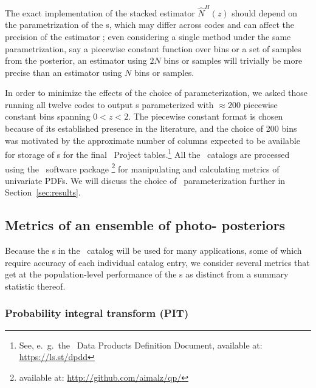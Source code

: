 The exact implementation of the stacked estimator $\hat{N}^{H}(z)$ should depend on the parametrization of the \pzpdf s, which may differ across codes and can affect the precision of the estimator \citep{Malz:qp}; even considering a single method under the same parametrization, say a piecewise constant function over bins or a set of samples from the posterior, an estimator using $2N$ bins or samples will trivially be more precise than an estimator using $N$ bins or samples.

In order to minimize the effects of the choice of parameterization, we asked those running all twelve codes to output \pzpdf s parameterized with $\approx 200$ piecewise constant bins spanning $0<z<2$.
The piecewise constant format is chosen because of its established presence in the literature, and the choice of 200 bins was motivated by the approximate number of columns expected to be available for storage of \pzpdf s for the final \lsst\ Project tables.\footnote{See, e.~g.~the \lsst\ Data Products Definition Document, available at: \url{https://ls.st/dpdd}}
All the \pzpdf\ catalogs are processed using the \qp\ software package \citep{Malz:qp}\footnote{available at: \url{http://github.com/aimalz/qp/}} for manipulating and calculating metrics of univariate PDFs.
We will discuss the choice of \pzpdf\ parameterization further in Section~\ref{sec:results}.


\subsection{Metrics of an ensemble of photo- posteriors}
\label{sec:qualmet}

Because the \pzpdf s in the \lsst\ catalog will be used for many applications, some of which require accuracy of each individual catalog entry, we consider several metrics that get at the population-level performance of the \pzpdf s as distinct from a summary statistic thereof.

\subsubsection{Probability integral transform (PIT)}
\label{sec:pit}


